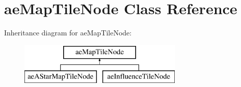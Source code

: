 \hypertarget{classae_map_tile_node}{}\section{ae\+Map\+Tile\+Node Class Reference}
\label{classae_map_tile_node}
Inheritance diagram for ae\+Map\+Tile\+Node\+:\begin{figure}[H]
\begin{center}
\leavevmode
\includegraphics[height=2.000000cm]{classae_map_tile_node}
\end{center}
\end{figure}
